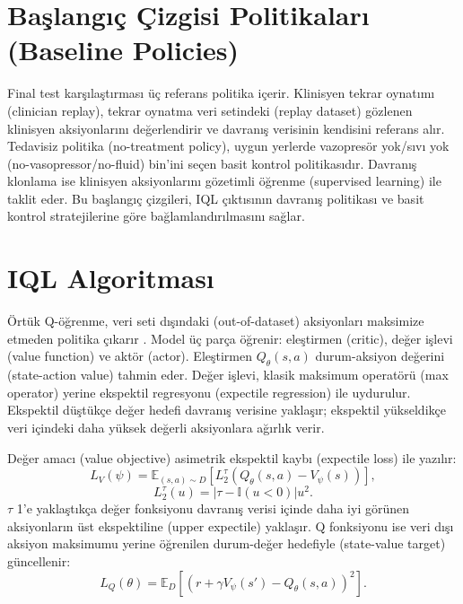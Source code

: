 \documentclass[conference]{IEEEtran}
\begin{document}
\section{Başlangıç Çizgisi Politikaları (Baseline Policies)}
Final test karşılaştırması üç referans politika içerir. Klinisyen tekrar oynatımı (clinician replay), tekrar oynatma veri setindeki (replay dataset) gözlenen klinisyen aksiyonlarını değerlendirir ve davranış verisinin kendisini referans alır. Tedavisiz politika (no-treatment policy), uygun yerlerde vazopresör yok/sıvı yok (no-vasopressor/no-fluid) bin'ini seçen basit kontrol politikasıdır. Davranış klonlama ise klinisyen aksiyonlarını gözetimli öğrenme (supervised learning) ile taklit eder. Bu başlangıç çizgileri, IQL çıktısının davranış politikası ve basit kontrol stratejilerine göre bağlamlandırılmasını sağlar.

\section{IQL Algoritması}
Örtük Q-öğrenme, veri seti dışındaki (out-of-dataset) aksiyonları maksimize etmeden politika çıkarır \cite{iql}. Model üç parça öğrenir: eleştirmen (critic), değer işlevi (value function) ve aktör (actor). Eleştirmen $Q_\theta(s,a)$ durum-aksiyon değerini (state-action value) tahmin eder. Değer işlevi, klasik maksimum operatörü (max operator) yerine ekspektil regresyonu (expectile regression) ile uydurulur. Ekspektil düştükçe değer hedefi davranış verisine yaklaşır; ekspektil yükseldikçe veri içindeki daha yüksek değerli aksiyonlara ağırlık verir.

Değer amacı (value objective) asimetrik ekspektil kaybı (expectile loss) ile yazılır:
\begin{equation}
L_V(\psi)=\mathbb{E}_{(s,a)\sim D}\left[L_2^\tau(Q_\theta(s,a)-V_\psi(s))\right],
\end{equation}
\begin{equation}
L_2^\tau(u)=|\tau-\mathbb{I}(u<0)|u^2.
\end{equation}
$\tau$ 1'e yaklaştıkça değer fonksiyonu davranış verisi içinde daha iyi görünen aksiyonların üst ekspektiline (upper expectile) yaklaşır. Q fonksiyonu ise veri dışı aksiyon maksimumu yerine öğrenilen durum-değer hedefiyle (state-value target) güncellenir:
\begin{equation}
L_Q(\theta)=\mathbb{E}_{D}\left[(r+\gamma V_\psi(s')-Q_\theta(s,a))^2\right].
\end{equation}
\end{document}
